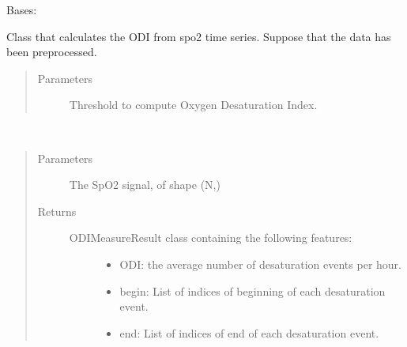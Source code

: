 \documentclass[letterpaper,10pt,english]{sphinxmanual}
\begin{document}
\begin{fulllineitems}
\label{\detokenize{OBM:OBM.ODIMeasure.ODIMeasure}}
Bases: 

Class that calculates the ODI from spo2 time series.
Suppose that the data has been preprocessed.
\begin{quote}\begin{description}
\item[{Parameters}] \leavevmode
{} \textendash{} Threshold to compute Oxygen Desaturation Index.

\end{description}\end{quote}

\begin{fulllineitems}
\label{\detokenize{OBM:OBM.ODIMeasure.ODIMeasure.compute}}~\begin{quote}\begin{description}
\item[{Parameters}] \leavevmode
{} \textendash{} The SpO2 signal, of shape (N,)

\item[{Returns}] \leavevmode
\begin{description}
\item[{ODIMeasureResult class containing the following features:}] \leavevmode\begin{itemize}
\item {} 
ODI: the average number of desaturation events per hour.

\item {} 
begin: List of indices of beginning of each desaturation event.

\item {} 
end: List of indices of end of each desaturation event.

\end{itemize}

\end{description}


\end{description}\end{quote}

\end{fulllineitems}


\end{fulllineitems}
\end{document}
